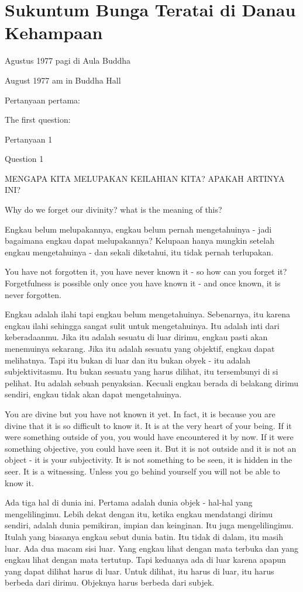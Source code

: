 \chapter{Sukuntum Bunga Teratai di Danau Kehampaan}

 Agustus 1977 pagi di Aula Buddha

 August 1977 am in Buddha Hall

\bahasa
Pertanyaan pertama:

\english
The first question:

\bahasa
Pertanyaan 1

\english
Question 1

\bahasa
MENGAPA KITA MELUPAKAN KEILAHIAN KITA? APAKAH ARTINYA INI?

\english
Why do we forget our divinity? what is the meaning of this?

\bahasa
Engkau belum melupakannya, engkau belum pernah mengetahuinya - jadi bagaimana engkau dapat melupakannya? Kelupaan hanya mungkin setelah engkau mengetahuinya - dan sekali diketahui, itu tidak pernah terlupakan.

\english
You have not forgotten it, you have never known it - so how can you forget it? Forgetfulness is possible only once you have known it - and once known, it is never forgotten.

\bahasa
Engkau adalah ilahi tapi engkau belum mengetahuinya. Sebenarnya, itu karena engkau ilahi sehingga sangat sulit untuk mengetahuinya. Itu adalah inti dari keberadaanmu. Jika itu adalah sesuatu di luar dirimu, engkau pasti akan menemuinya sekarang. Jika itu adalah sesuatu yang objektif, engkau dapat melihatnya. Tapi itu bukan di luar dan itu bukan obyek - itu adalah subjektivitasmu. Itu bukan sesuatu yang harus dilihat, itu tersembunyi di si pelihat. Itu adalah sebuah penyaksian. Kecuali engkau berada di belakang dirimu sendiri, engkau tidak akan dapat mengetahuinya.

\english
You are divine but you have not known it yet. In fact, it is because you are divine that it is so difficult to know it. It is at the very heart of your being. If it were something outside of you, you would have encountered it by now. If it were something objective, you could have seen it. But it is not outside and it is not an object - it is your subjectivity. It is not something to be seen, it is hidden in the seer. It is a witnessing. Unless you go behind yourself you will not be able to know it.

\bahasa
Ada tiga hal di dunia ini. Pertama adalah dunia objek - hal-hal yang mengelilingimu. Lebih dekat dengan itu, ketika engkau mendatangi dirimu sendiri, adalah dunia pemikiran, impian dan keinginan. Itu juga mengelilingimu. Itulah yang biasanya engkau sebut dunia batin. Itu tidak di dalam, itu masih luar. Ada dua macam sisi luar. Yang engkau lihat dengan mata terbuka dan yang engkau lihat dengan mata tertutup. Tapi keduanya ada di luar karena apapun yang dapat dilihat harus di luar. Untuk dilihat, itu harus di luar, itu harus berbeda dari dirimu. Objeknya harus berbeda dari subjek.

